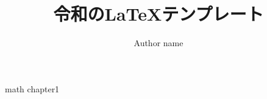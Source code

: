 \documentclass[a4paper,11pt]{ltjreport}
\begin{document}
\title{令和の\LaTeX テンプレート}
\author{Author name}
\date{\the\year}
\maketitle
\tableofcontents

{math}
{chapter1}
\end{document}
